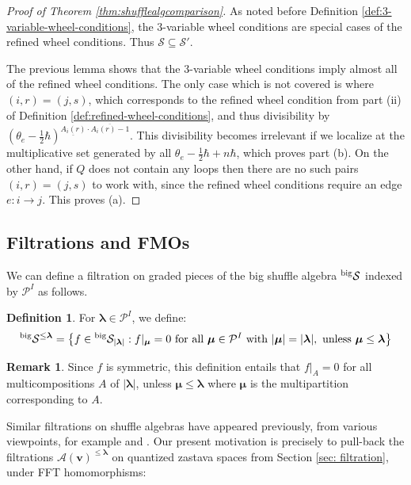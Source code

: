 \documentclass[11pt,reqno]{amsart}
\renewcommand{\mathbf}{\mathbold}
\numberwithin{equation}{section}
\theoremstyle{definition}
\newtheorem{Remark}[equation]{Remark}
\newtheorem{Definition}[equation]{Definition}
\newcommand{\cA}{\mathcal{A}}
\newcommand{\cP}{\mathcal{P}}
\newcommand{\cS}{\mathcal{S}}
\newcommand{\bv}{\mathbf{v}}
\newcommand{\leftexp}[2]{\vphantom{#2}^{#1} #2}
\renewcommand{\bv}{\mathbf{v}} %
\newcommand{\quiver}{Q}
\newcommand{\vertexset}{I}
\newcommand{\Partitions}{\cP}
\newcommand{\bla}{{\boldsymbol{\lambda}}}
\newcommand{\bmu}{{\boldsymbol{\mu}}}
\newcommand{\qzast}{\cA}
\newcommand{\shu}{\cS}
\newcommand{\preshu}{\leftexp{\mathrm{big}}{\cS}}
\begin{document}
\begin{proof}[Proof of Theorem \ref{thm:shufflealgcomparison}]
    As noted before Definition \ref{def:3-variable-wheel-conditions}, the 3-variable wheel conditions are special cases of the refined wheel conditions. Thus $\shu \subseteq \shu'$.

    The previous lemma shows that the 3-variable wheel conditions imply almost all of the refined wheel conditions.  The only case which is not covered is where $(i,r) = (j,s)$, which  corresponds to the refined wheel condition from part (ii) of Definition \ref{def:refined-wheel-conditions}, and thus divisibility by $(\theta_e-\tfrac{1}{2}\hbar)^{\underline{A_i(r)}\cdot\overline{A_i(r)-1}}$.  This divisibility  becomes irrelevant  if we localize at the multiplicative set generated by all $\theta_e-\tfrac{1}{2}\hbar+n\hbar$, which proves part (b).     On the other hand, if $\quiver$ does not contain any loops then there are no such pairs $(i,r) = (j,s)$ to work with, since the refined wheel conditions require an edge $e:i\rightarrow j$.  This proves (a).    
\end{proof}



\subsection{Filtrations and FMOs}

We can define a filtration on graded pieces of the big shuffle algebra $\preshu$ indexed by $\Partitions^I$ as follows. 
\begin{Definition}
    For $\bla \in \Partitions^\vertexset$, we define:
    $$
        \preshu^{\leq \bla} = \left\{ f \in \preshu_{|\bla|} : f|_{\bmu} = 0 \text{ for all } \bmu \in \Partitions^\vertexset \text{ with } |\bmu| = |\bla|, \text{ unless } \bmu \leq \bla \right\}
    $$
\end{Definition}

\begin{Remark}
    \label{rem:filtrationmulticompositions}
    Since $f$ is symmetric, this definition entails that $f|_A = 0$ for all multicompositions $A$ of $|\bla|$, unless $\bmu \leq \bla$ where $\bmu$ is the multipartition corresponding to $A$.
\end{Remark}

Similar filtrations on shuffle algebras have appeared previously, from various viewpoints, for example \cite[Definition 1.7]{FHHSY} and \cite[\S 3.3]{Negut2}.  Our present motivation is precisely to pull-back the filtrations  $\qzast(\bv)^{\leq \bla}$ on quantized zastava spaces  from Section \ref{sec: filtration}, under FFT homomorphisms:
\end{document}
